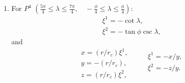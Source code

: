 \documentclass{report}
\begin{document}
\begin{enumerate}
\item For $P^4$ $\left(\frac{5\pi}{4} \leq \lambda \leq  \frac{7\pi}{4}, \quad -\frac{\phi}{4} \leq \lambda \leq  \frac{\phi}{4} \right)$:
\begin{equation} \label{eq:P4-sphere-to-cube}
    \begin{array}{l}
        \xi^1 = - \cot \lambda ,\\
        \xi^2 = - \tan \phi \csc \lambda ,
    \end{array}
\end{equation}
and
\begin{equation}\label{eq:P4-cube-to-global-and-vice-versa}
    \begin{array}{l}
        x = (r/r_c) \xi^1,  \\
        y = -(r/r_c),\\
        z = (r/r_c) \xi^2,
    \end{array}
    \qquad
    \begin{array}{l}
        \xi^1 = -{x}/{y}, \\
        \xi^2 = -{z}/{y} .\\
    \end{array}
\end{equation}


\end{enumerate}
\end{document}
